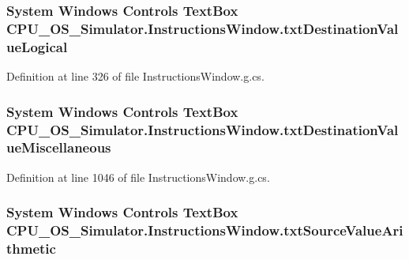 \subsubsection[{txt\+Destination\+Value\+Logical}]{\setlength{\rightskip}{0pt plus 5cm}System Windows Controls Text\+Box C\+P\+U\+\_\+\+O\+S\+\_\+\+Simulator.\+Instructions\+Window.\+txt\+Destination\+Value\+Logical\hspace{0.3cm}{\ttfamily [package]}}\label{class_c_p_u___o_s___simulator_1_1_instructions_window_af1a2860f125c3a8e25c73c1b04290438}


Definition at line 326 of file Instructions\+Window.\+g.\+cs.

\hypertarget{class_c_p_u___o_s___simulator_1_1_instructions_window_a7fa1615bacb3264ac8ce61787a28d477}{}
\subsubsection[{txt\+Destination\+Value\+Miscellaneous}]{\setlength{\rightskip}{0pt plus 5cm}System Windows Controls Text\+Box C\+P\+U\+\_\+\+O\+S\+\_\+\+Simulator.\+Instructions\+Window.\+txt\+Destination\+Value\+Miscellaneous\hspace{0.3cm}{\ttfamily [package]}}\label{class_c_p_u___o_s___simulator_1_1_instructions_window_a7fa1615bacb3264ac8ce61787a28d477}


Definition at line 1046 of file Instructions\+Window.\+g.\+cs.

\hypertarget{class_c_p_u___o_s___simulator_1_1_instructions_window_afc01788dc74f761b6cce800975394d2e}{}
\subsubsection[{txt\+Source\+Value\+Arithmetic}]{\setlength{\rightskip}{0pt plus 5cm}System Windows Controls Text\+Box C\+P\+U\+\_\+\+O\+S\+\_\+\+Simulator.\+Instructions\+Window.\+txt\+Source\+Value\+Arithmetic\hspace{0.3cm}{\ttfamily [package]}}\label{class_c_p_u___o_s___simulator_1_1_instructions_window_afc01788dc74f761b6cce800975394d2e}


